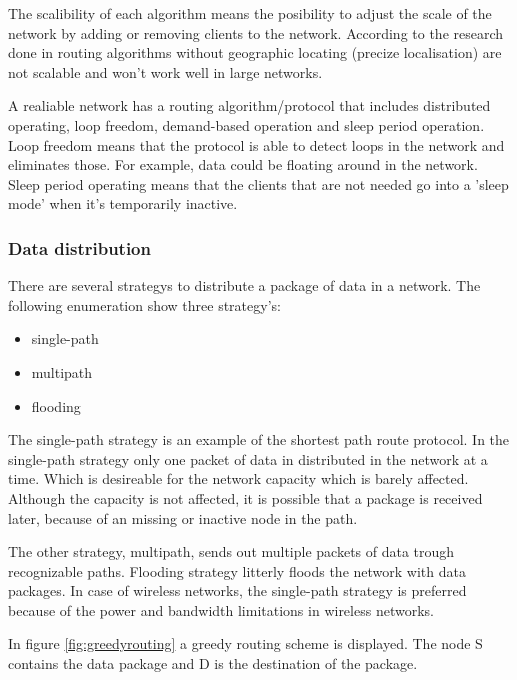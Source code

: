 \documentclass[10pt,a4paper]{article}
\begin{document}
The scalibility of each algorithm means the posibility to adjust the scale of the network by adding or removing clients to the network. According to the research done in \cite{geographicalrouting}\cite{scalablelocation} routing algorithms without geographic locating (precize localisation) are not scalable and won't work well in large networks. 

A realiable network has a routing algorithm/protocol that includes distributed operating, loop freedom, demand-based operation and sleep period operation. Loop freedom means that the protocol is able to detect loops in the network and eliminates those. For example, data could be floating around in the network. Sleep period operating means that the clients that are not needed go into a 'sleep mode' when it's temporarily inactive.\cite{position-based}


\subsubsection{Data distribution}
There are several strategys to distribute a package of data in a network. The following enumeration show three strategy's:
\begin{itemize}
\setlength\itemsep{0em}
    \item single-path
    \item multipath
    \item flooding
\end{itemize}

The single-path strategy is an example of the shortest path route protocol. In the single-path strategy only one packet of data in distributed in the network at a time. Which is desireable for the network capacity which is barely affected. Although the capacity is not affected, it is possible that a package is received later, because of an missing or inactive node in the path. \cite{position-based}

The other strategy, multipath, sends out multiple packets of data trough recognizable paths. Flooding strategy litterly floods the network with data packages. In case of wireless networks, the single-path strategy is preferred because of the power and bandwidth limitations in wireless networks. \cite{position-based}



In figure \ref{fig:greedyrouting} a greedy routing scheme is displayed. The node S contains the data package and D is the destination of the package. 
\end{document}

